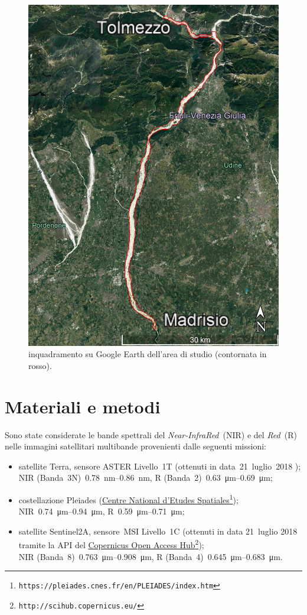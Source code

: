 \begin{figure}
	\centering
	\includegraphics[width=.7\textwidth]{files/overview_gearth.jpg}
	\caption[inquadramento su Google Earth dell'area di studio]{inquadramento su Google Earth dell'area di studio (contornata in rosso).}
	\label{fig:overview-gearth}
\end{figure}


\section{Materiali e metodi}
Sono state considerate le bande spettrali del \emph{Near-InfraRed}~(NIR) e del \emph{Red}~(R) nelle immagini satellitari multibande provenienti dalle seguenti missioni:
%
\begin{itemize}
	\item satellite Terra, sensore ASTER Livello~1T (ottenuti in data~21~luglio~2018 );  
		\\
		NIR (Banda~3N)~\SIrange[range-phrase={-}]{0.78}{0.86}{\nano\m}, R (Banda~2)~\SIrange[range-phrase={-}]{0.63}{0.69}{\micro\m};
	\item costellazione Pleiades (\href{https://pleiades.cnes.fr/en/PLEIADES/index.htm}{Centre National d'Etudes Spatiales}\footnote{\texttt{https://pleiades.cnes.fr/en/PLEIADES/index.htm}}); 
		\\
		NIR~\SIrange[range-phrase={-}]{0.74}{0.94}{\micro\m}, R~\SIrange[range-phrase={-}]{0.59}{0.71}{\micro\m};
	\item satellite Sentinel2A, sensore~MSI Livello~1C (ottenuti in data 21~luglio 2018 tramite la API del \href{http://scihub.copernicus.eu/}{Copernicus Open Access Hub}\footnote{\texttt{http://scihub.copernicus.eu/}});
		\\
		NIR (Banda~8)~\SIrange[range-phrase={-}]{0.763}{0.908}{\micro\m}, R (Banda~4)~\SIrange[range-phrase={-}]{0.645}{0.683}{\micro\m}.
\end{itemize}
%

